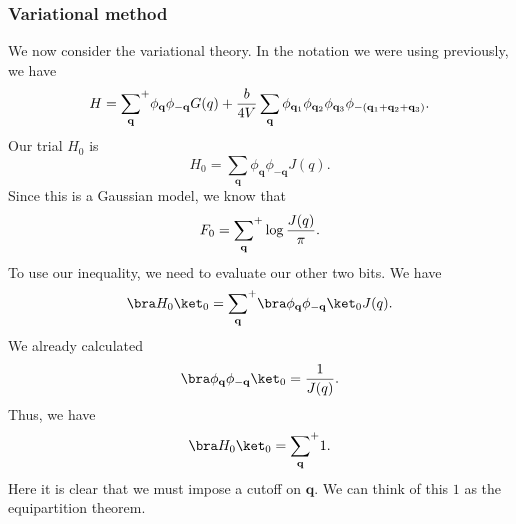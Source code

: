 \documentclass[a4paper]{article}
\newcommand\splus{\!{\vphantom{\prod}}^+}
\begin{document}
\subsubsection*{Variational method}
We now consider the variational theory. In the notation we were using previously, we have
\[
  H = \sum_\mathbf{q} \splus \phi_\mathbf{q} \phi_{-\mathbf{q}} G(q) + \frac{b}{4V} \sum_\mathbf{q} \phi_{\mathbf{q}_1} \phi_{\mathbf{q}_2} \phi_{\mathbf{q}_3} \phi_{-(\mathbf{q}_1 + \mathbf{q}_2 + \mathbf{q}_3)}.
\]
Our trial $H_0$ is
\[
  H_0 = \sum_\mathbf{q} \phi_\mathbf{q} \phi_{-\mathbf{q}} J(q).
\]
Since this is a Gaussian model, we know that
\[
  F_0 = \sum_{\mathbf{q}} \splus \log \frac{J(q)}{\pi}.
\]
To use our inequality, we need to evaluate our other two bits. We have
\[
  \bra H_0\ket_0 = \sum_{\mathbf{q}}\splus \bra \phi_\mathbf{q} \phi_{-\mathbf{q}}\ket_0 J(q).
\]
We already calculated
\[
  \bra \phi_{\mathbf{q}} \phi_{-\mathbf{q}} \ket_0 = \frac{1}{J(q)}.
\]
Thus, we have
\[
  \bra H_0 \ket_0 = \sum_{\mathbf{q}} \splus 1.
\]
Here it is clear that we must impose a cutoff on $\mathbf{q}$. We can think of this $1$ as the equipartition theorem.
\end{document}
